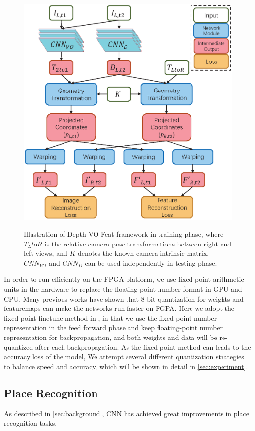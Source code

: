 \begin{figure}[thb]  
    \centering  
    {\includegraphics[width=0.95\linewidth]{fig/depth_vo_feat.eps}\label{fig:dvo}}
    \caption{Illustration of Depth-VO-Feat framework in training phase, where $T_LtoR$ is the relative camera pose transformations between right and left views, and $K$ denotes the known camera intrinsic matrix. $CNN_{VO}$ and $CNN_D$ can be used independently in testing phase. }
\end{figure}

In order to run efficiently on the FPGA platform, we use fixed-point arithmetic units in the hardware to replace the floating-point number format in GPU and CPU. Many previous works have shown that 8-bit quantization for weights and featuremaps can make the networks run faster on FGPA. Here we adopt the fixed-point finetune method in \cite{Yu:2018:IDC:3299999.3283452}, in that we use the fixed-point number representation in the feed forward phase and keep floating-point number representation for backpropagation, and both weights and data will be re-quantized after each backpropagation. As the fixed-point method can leads to the accuracy loss of the model, We attempt several different quantization strategies to balance speed and accuracy, which will be shown in detail in \cref{sec:experiment}.

\subsection{Place Recognition}
As described in \cref{sec:background}, CNN has achieved great improvements in place recognition tasks. 
